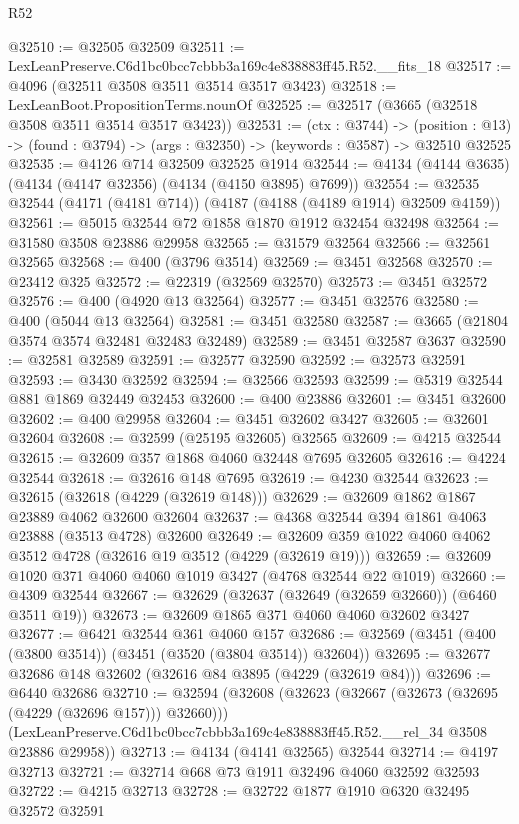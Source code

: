 \begin{lexlean}{R52}
\begin{coremodule}
@32510 := @32505 @32509
@32511 := LexLeanPreserve.C6d1bc0bcc7cbbb3a169c4e838883ff45.R52.__fits_18
@32517 := @4096 (@32511 @3508 @3511 @3514 @3517 @3423)
@32518 := LexLeanBoot.PropositionTerms.nounOf
@32525 := @32517 (@3665 (@32518 @3508 @3511 @3514 @3517 @3423))
@32531 := (ctx : @3744) ->
  (position : @13) -> (found : @3794) -> (args : @32350) -> (keywords : @3587) -> @32510 @32525
@32535 := @4126 @714 @32509 @32525 @1914
@32544 := @4134 (@4144 @3635) (@4134 (@4147 @32356) (@4134 (@4150 @3895) @7699))
@32554 := @32535 @32544 (@4171 (@4181 @714)) (@4187 (@4188 (@4189 @1914) @32509 @4159))
@32561 := @5015 @32544 @72 @1858 @1870 @1912 @32454 @32498
@32564 := @31580 @3508 @23886 @29958
@32565 := @31579 @32564
@32566 := @32561 @32565
@32568 := @400 (@3796 @3514)
@32569 := @3451 @32568
@32570 := @23412 @325
@32572 := @22319 (@32569 @32570)
@32573 := @3451 @32572
@32576 := @400 (@4920 @13 @32564)
@32577 := @3451 @32576
@32580 := @400 (@5044 @13 @32564)
@32581 := @3451 @32580
@32587 := @3665 (@21804 @3574 @3574 @32481 @32483 @32489)
@32589 := @3451 @32587 @3637
@32590 := @32581 @32589
@32591 := @32577 @32590
@32592 := @32573 @32591
@32593 := @3430 @32592
@32594 := @32566 @32593
@32599 := @5319 @32544 @881 @1869 @32449 @32453
@32600 := @400 @23886
@32601 := @3451 @32600
@32602 := @400 @29958
@32604 := @3451 @32602 @3427
@32605 := @32601 @32604
@32608 := @32599 (@25195 @32605) @32565
@32609 := @4215 @32544
@32615 := @32609 @357 @1868 @4060 @32448 @7695 @32605
@32616 := @4224 @32544
@32618 := @32616 @148 @7695
@32619 := @4230 @32544
@32623 := @32615 (@32618 (@4229 (@32619 @148)))
@32629 := @32609 @1862 @1867 @23889 @4062 @32600 @32604
@32637 := @4368 @32544 @394 @1861 @4063 @23888 (@3513 @4728) @32600
@32649 := @32609 @359 @1022 @4060 @4062 @3512 @4728 (@32616 @19 @3512 (@4229 (@32619 @19)))
@32659 := @32609 @1020 @371 @4060 @4060 @1019 @3427 (@4768 @32544 @22 @1019)
@32660 := @4309 @32544
@32667 := @32629 (@32637 (@32649 (@32659 @32660)) (@6460 @3511 @19))
@32673 := @32609 @1865 @371 @4060 @4060 @32602 @3427
@32677 := @6421 @32544 @361 @4060 @157
@32686 := @32569 (@3451 (@400 (@3800 @3514)) (@3451 (@3520 (@3804 @3514)) @32604))
@32695 := @32677 @32686 @148 @32602 (@32616 @84 @3895 (@4229 (@32619 @84)))
@32696 := @6440 @32686
@32710 := @32594
    (@32608
      (@32623 (@32667 (@32673 (@32695 (@4229 (@32696 @157))) @32660)))
      (LexLeanPreserve.C6d1bc0bcc7cbbb3a169c4e838883ff45.R52.__rel_34 @3508 @23886 @29958))
@32713 := @4134 (@4141 @32565) @32544
@32714 := @4197 @32713
@32721 := @32714 @668 @73 @1911 @32496 @4060 @32592 @32593
@32722 := @4215 @32713
@32728 := @32722 @1877 @1910 @6320 @32495 @32572 @32591

\end{coremodule}
\end{lexlean}
